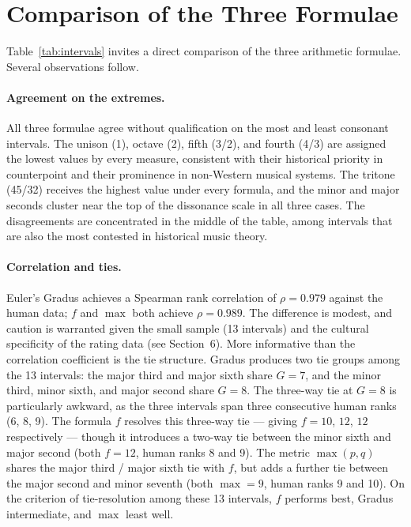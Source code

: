 \documentclass[11pt,a4paper]{article}
\begin{document}

\section{Comparison of the Three Formulae}

Table~\ref{tab:intervals} invites a direct comparison of the three arithmetic
formulae. Several observations follow.

\paragraph{Agreement on the extremes.}
All three formulae agree without qualification on the most and least consonant
intervals. The unison (1), octave (2), fifth (3/2), and fourth (4/3) are
assigned the lowest values by every measure, consistent with their historical
priority in counterpoint and their prominence in non-Western musical systems.
The tritone (45/32) receives the highest value under every formula, and the
minor and major seconds cluster near the top of the dissonance scale in all
three cases. The disagreements are concentrated in the middle of the table,
among intervals that are also the most contested in historical music theory.

\paragraph{Correlation and ties.}
Euler's Gradus achieves a Spearman rank correlation of $\rho = 0.979$ against
the human data; $f$ and $\max$ both achieve $\rho = 0.989$. The difference is
modest, and caution is warranted given the small sample (13 intervals) and the
cultural specificity of the rating data (see Section~6). More informative than
the correlation coefficient is the tie structure. Gradus produces two tie
groups among the 13 intervals: the major third and major sixth share $G = 7$,
and the minor third, minor sixth, and major second share $G = 8$. The
three-way tie at $G = 8$ is particularly awkward, as the three intervals span
three consecutive human ranks (6, 8, 9). The formula $f$ resolves this
three-way tie --- giving $f = 10$, $12$, $12$ respectively --- though it
introduces a two-way tie between the minor sixth and major second (both $f =
12$, human ranks 8 and 9). The metric $\max(p,q)$ shares the major third /
major sixth tie with $f$, but adds a further tie between the major second and
minor seventh (both $\max = 9$, human ranks 9 and 10). On the criterion of
tie-resolution among these 13 intervals, $f$ performs best, Gradus
intermediate, and $\max$ least well.
\end{document}
